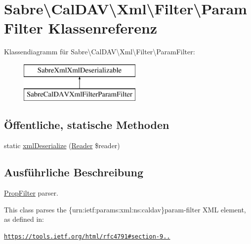\hypertarget{class_sabre_1_1_cal_d_a_v_1_1_xml_1_1_filter_1_1_param_filter}{}\section{Sabre\textbackslash{}Cal\+D\+AV\textbackslash{}Xml\textbackslash{}Filter\textbackslash{}Param\+Filter Klassenreferenz}
\label{class_sabre_1_1_cal_d_a_v_1_1_xml_1_1_filter_1_1_param_filter}
Klassendiagramm für Sabre\textbackslash{}Cal\+D\+AV\textbackslash{}Xml\textbackslash{}Filter\textbackslash{}Param\+Filter\+:\begin{figure}[H]
\begin{center}
\leavevmode
\includegraphics[height=2.000000cm]{class_sabre_1_1_cal_d_a_v_1_1_xml_1_1_filter_1_1_param_filter}
\end{center}
\end{figure}
\subsection*{Öffentliche, statische Methoden}
\begin{DoxyCompactItemize}
\item 
static \mbox{\hyperlink{class_sabre_1_1_cal_d_a_v_1_1_xml_1_1_filter_1_1_param_filter_a89565cd2892a56a90868b89300d2ccc0}{xml\+Deserialize}} (\mbox{\hyperlink{class_sabre_1_1_xml_1_1_reader}{Reader}} \$reader)
\end{DoxyCompactItemize}


\subsection{Ausführliche Beschreibung}
\mbox{\hyperlink{class_sabre_1_1_cal_d_a_v_1_1_xml_1_1_filter_1_1_prop_filter}{Prop\+Filter}} parser.

This class parses the \{urn\+:ietf\+:params\+:xml\+:ns\+:caldav\}param-\/filter X\+ML element, as defined in\+:

\href{https://tools.ietf.org/html/rfc4791#section-9.7.3}{\tt https\+://tools.\+ietf.\+org/html/rfc4791\#section-\/9..}

